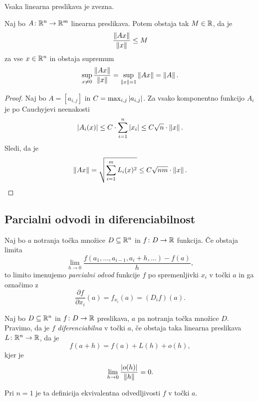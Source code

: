 \begin{posledica}
Vsaka linearna preslikava je zvezna.
\end{posledica}

\begin{trditev}\label{td:1}
Naj bo $A \colon \mathbb{R}^n \to \mathbb{R}^m$ linearna preslikava. Potem obstaja
tak $M \in \mathbb{R}$, da je
\[
\frac{\left\lVert Ax\right\rVert}{\left\lVert x\right\rVert} \leq M
\]
za vse $x \in \mathbb{R}^n$ in obstaja supremum
\[
\sup_{x \ne 0} \frac{\left\lVert Ax\right\rVert}{\left\lVert x\right\rVert} =
\sup_{\left\lVert x\right\rVert = 1}\left\lVert Ax\right\rVert =
\left\lVert A\right\rVert.
\]
\end{trditev}

\begin{proof}
Naj bo $A = [a_{i,j}]$ in $C = \max_{i,j}\left\lvert a_{i,j}\right\rvert$. Za vsako
komponentno funkcijo $A_i$ je po Cauchyjevi neenakosti
\[
\left\lvert A_i(x)\right\rvert \leq
C \cdot \sum_{i=1}^n \left\lvert x_i\right\rvert \leq
C\sqrt{n} \cdot \left\lVert x\right\rVert.
\]
Sledi, da je
\[
\left\lVert Ax\right\rVert =
\sqrt{\sum_{i=1}^m L_i(x)^2} \leq
C \sqrt{nm} \cdot \left\lVert x\right\rVert. \qedhere
\]
\end{proof}

\newpage

\subsection{Parcialni odvodi in diferenciabilnost}

\begin{definicija}
Naj bo $a$ notranja točka množice $D \subseteq \mathbb{R}^n$ in
$f \colon D \to \mathbb{R}$ funkcija. Če obstaja limita
\[
\lim_{h \to 0}
\frac{f(a_1, \dots, a_{i-1}, a_i+h, \dots) - f(a)}{h},
\]
to limito imenujemo
\emph{parcialni odvod} funkcije
$f$ po spremenljivki $x_i$ v točki $a$ in ga označimo z
\[
\frac{\partial f}{\partial x_i}(a) = f_{x_i}(a) = (D_if)(a).
\]
\end{definicija}

\begin{definicija}
Naj bo $D \subseteq \mathbb{R}^n$ in $f \colon D \to \mathbb{R}$ preslikava, $a$ pa
notranja točka množice $D$. Pravimo, da je $f$
\emph{diferenciabilna} v točki
$a$, če obstaja taka linearna preslikava
$L \colon \mathbb{R}^n \to \mathbb{R}$, da je
\[
f(a+h) = f(a) + L(h) + o(h),
\]
kjer je
\[
\lim_{h \to 0}\frac{\left\lvert o(h)\right\rvert}{\left\lVert h\right\rVert} = 0.
\]
\end{definicija}

\begin{opomba}
Pri $n=1$ je ta definicija ekvivalentna odvedljivosti $f$ v točki
$a$.
\end{opomba}

